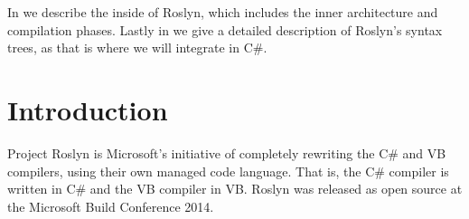 

In  we describe the inside of Roslyn, which includes the inner architecture and compilation phases. Lastly in  we give a detailed description of Roslyn's syntax trees, as that is where we will integrate \stmnamesp in C\#.



%

















\section{Introduction}\label{sec:intro}
Project Roslyn is Microsoft's initiative of completely rewriting the C\# and \ac{VB} compilers, using their own managed code language. That is, the C\# compiler is written in C\# and the \ac{VB} compiler in \ac{VB}. Roslyn was released as open source at the Microsoft Build Conference 2014\cite{csharpBuild}.

